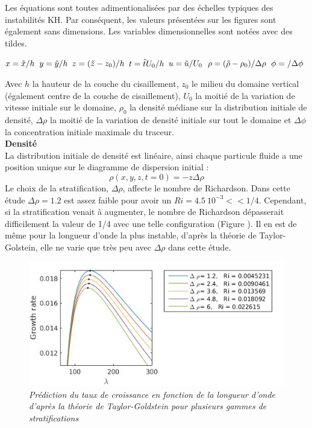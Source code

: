 \documentclass[a4paper,12pt]{article}
\begin{document}
    Les équations sont toutes adimentionalisées par des échelles typiques des instabilités KH.  Par conséquent, les valeurs présentées sur les figures sont également sans dimensions. Les variables dimensionnelles sont notées avec des tildes. 
    \begin{center}
       $x=\Tilde{x}/h$  \hspace{1cm}  $y=\Tilde{y}/h$  \hspace{1cm}   $z=(\Tilde{z}-z_0)/h$   \hspace{1cm}    $t=\Tilde{t}U_0/h$    \hspace{1cm}  $u=\Tilde{u}/U_{0}$    \hspace{1cm}   $\rho =( \Tilde{\rho}-\rho_0)/\Delta\rho$   \hspace{1cm}     $\phi=\title{\phi}/\Delta\phi$ \\ 
    \end{center}
    Avec $h$ la hauteur de la couche du cisaillement, $z_0$ le milieu du domaine vertical (également centre de la couche de cisaillement), $U_0$ la moitié de la variation de vitesse initiale sur le domaine, $\rho_0$ la densité médiane sur la distribution initiale de densité, $\Delta\rho$ la moitié de la variation de densité initiale sur tout le domaine et $\Delta\phi$ la concentration initiale maximale du traceur.\\
    \newline    
    \textbf{Densité} \\
    La distribution initiale de densité est linéaire, ainsi chaque particule fluide a une position unique sur le diagramme de dispersion initial :
    \begin{equation}
    \label{rho_ini}
        \rho(x,y,z,t=0)=-z\Delta\rho
    \end{equation}
    Le choix de la stratification, $\Delta\rho$, affecte le nombre de Richardson. Dans cette étude $\Delta\rho=1.2$ est assez faible pour avoir un $Ri=4.5\ 10^{-3}<< 1/4$. Cependant, si la stratification venait à augmenter, le nombre de Richardson dépasserait difficilement la valeur de 1/4 avec une telle configuration (Figure ). Il en est de même pour la longueur d'onde la plus instable,  d'après la théorie de Taylor-Golstein, elle ne varie que très peu avec $\Delta\rho$ dans cette étude. \\
    \begin{figure}[!h]
	\centering		
		\includegraphics[width=0.9\linewidth]{figures/TG_delatrho_2.jpg}
\caption[Taylor-Goldstein]{\textit{Prédiction du taux de croissance en fonction de la longueur d'onde d'après la théorie de Taylor-Goldstein pour plusieurs gammes de stratifications}}
	\label{TG_deltarho}
\end{figure}
\end{document}
